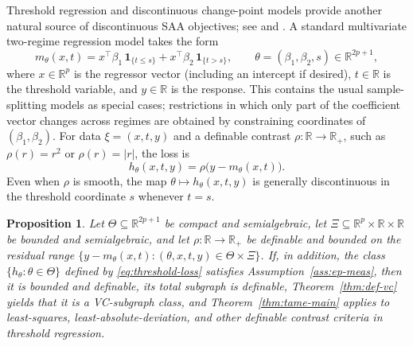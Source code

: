 \documentclass[11pt]{article}
\newtheorem{proposition}[theorem]{Proposition}\newtheorem{lemma}[theorem]{Lemma}\newtheorem{corollary}[theorem]{Corollary}\newtheorem{assumption}{Assumption}[section]\theoremstyle{definition}
\begin{document}
Threshold regression and discontinuous change-point models provide
another natural source of discontinuous SAA objectives; see \citet{Hansen2000}
and \citet{KoulQianSurgailis2003}. A standard multivariate two-regime
regression model takes the form 
\begin{equation}
m_{\theta}(x,t)=x^{\top}\beta_{1}\,\mathbf{1}_{\{t\le s\}}+x^{\top}\beta_{2}\,\mathbf{1}_{\{t>s\}},\qquad\theta=(\beta_{1},\beta_{2},s)\in\mathbb{R}^{2p+1},\label{eq:threshold-reg}
\end{equation}
where $x\in\mathbb{R}^{p}$ is the regressor vector (including an
intercept if desired), $t\in\mathbb{R}$ is the threshold variable,
and $y\in\mathbb{R}$ is the response. This contains the usual sample-splitting
models as special cases; restrictions in which only part of the coefficient
vector changes across regimes are obtained by constraining coordinates
of $(\beta_{1},\beta_{2})$. For data $\xi=(x,t,y)$ and a definable
contrast $\rho:\mathbb{R}\to\mathbb{R}_{+}$, such as $\rho(r)=r^{2}$
or $\rho(r)=|r|$, the loss is 
\begin{equation}
h_{\theta}(x,t,y)=\rho\bigl(y-m_{\theta}(x,t)\bigr).\label{eq:threshold-loss}
\end{equation}
Even when $\rho$ is smooth, the map $\theta\mapsto h_{\theta}(x,t,y)$
is generally discontinuous in the threshold coordinate $s$ whenever
$t=s$.

\begin{proposition}\label{prop:threshold} Let $\Theta\subseteq\mathbb{R}^{2p+1}$
be compact and semialgebraic, let $\Xi\subseteq\mathbb{R}^{p}\times\mathbb{R}\times\mathbb{R}$
be bounded and semialgebraic, and let $\rho:\mathbb{R}\to\mathbb{R}_{+}$
be definable and bounded on the residual range
$\{y-m_{\theta}(x,t):(\theta,x,t,y)\in\Theta\times\Xi\}$. If, in addition, the
class $\{h_{\theta}:\theta\in\Theta\}$ defined by \eqref{eq:threshold-loss}
satisfies Assumption~\ref{ass:ep-meas},
then it is bounded and definable, its total subgraph is definable,
Theorem~\ref{thm:def-vc} yields that it is a VC-subgraph class, and
Theorem~\ref{thm:tame-main} applies to least-squares, least-absolute-deviation,
and other definable contrast criteria in threshold regression. \end{proposition}
\end{document}
